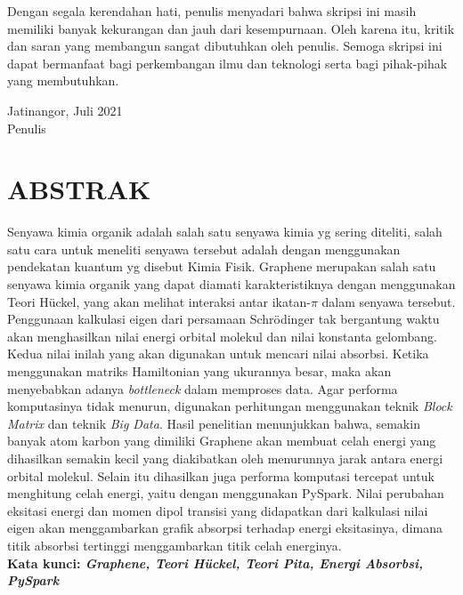 \documentclass[12pt,a4paper]{report}
\begin{document}
Dengan segala kerendahan hati, penulis menyadari bahwa skripsi ini masih memiliki banyak kekurangan dan jauh dari kesempurnaan. Oleh karena itu, kritik dan saran yang membangun sangat dibutuhkan oleh penulis. Semoga skripsi ini dapat bermanfaat bagi perkembangan ilmu dan teknologi serta bagi pihak-pihak yang membutuhkan.
\vspace{2cm}
\begin{flushright}
	Jatinangor, Juli 2021\\
	\vspace{2cm}
	Penulis
\end{flushright}


\chapter*{\centering ABSTRAK}
\thispagestyle{myplain}
\begin{spacing}{1.0}
\noindent Senyawa kimia organik adalah salah satu senyawa kimia yg sering diteliti, salah satu cara untuk meneliti senyawa tersebut adalah dengan menggunakan pendekatan kuantum yg disebut Kimia Fisik. Graphene merupakan salah satu senyawa kimia organik yang dapat diamati karakteristiknya dengan menggunakan Teori Hückel, yang akan melihat interaksi antar ikatan-$\pi$ dalam senyawa tersebut. Penggunaan kalkulasi eigen dari persamaan Schrödinger tak bergantung waktu akan menghasilkan nilai energi orbital molekul dan nilai konstanta gelombang. Kedua nilai inilah yang akan digunakan untuk mencari nilai absorbsi. Ketika menggunakan matriks Hamiltonian yang ukurannya besar, maka akan menyebabkan adanya \textit{bottleneck} dalam memproses data. Agar performa komputasinya tidak menurun, digunakan perhitungan menggunakan teknik \textit{Block Matrix} dan teknik \textit{Big Data}. Hasil penelitian menunjukkan bahwa, semakin banyak atom karbon yang dimiliki Graphene akan membuat celah energi yang dihasilkan semakin kecil yang diakibatkan oleh menurunnya jarak antara energi orbital molekul. Selain itu dihasilkan juga performa komputasi tercepat untuk menghitung celah energi, yaitu dengan menggunakan PySpark. Nilai perubahan eksitasi energi dan momen dipol transisi yang didapatkan dari kalkulasi nilai eigen akan menggambarkan grafik absorpsi terhadap energi eksitasinya, dimana titik absorbsi tertinggi menggambarkan titik celah energinya.\\
\textbf{Kata kunci: \textit{Graphene, Teori Hückel, Teori Pita, Energi Absorbsi, PySpark}}
\end{spacing}
\end{document}
